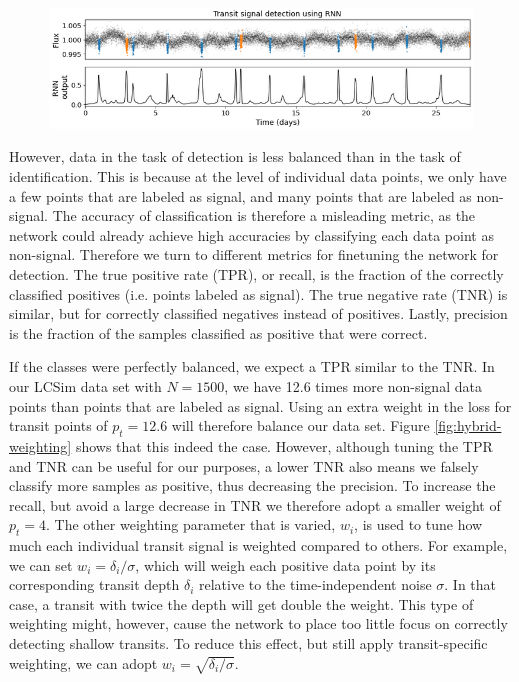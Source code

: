 \begin{figure}
    \centering
    \includegraphics[width=0.8\linewidth]{Experiments/Figures/Hybrid/PTS_example.png}
    \caption{}
    \label{fig:hybrid-pts}
\end{figure}

However, data in the task of detection is less balanced than in the task of identification. This is because at the level of individual data points, we only have a few points that are labeled as signal, and many points that are labeled as non-signal. The accuracy of classification is therefore a misleading metric, as the network could already achieve high accuracies by classifying each data point as non-signal. Therefore we turn to different metrics for finetuning the network for detection. The true positive rate (TPR), or recall, is the fraction of the correctly classified positives (i.e. points labeled as signal). The true negative rate (TNR) is similar, but for correctly classified negatives instead of positives. Lastly, precision is the fraction of the samples classified as positive that were correct. 

If the classes were perfectly balanced, we expect a TPR similar to the TNR. In our LCSim data set with $N=1500$, we have 12.6 times more non-signal data points than points that are labeled as signal. Using an extra weight in the loss for transit points of $p_t=12.6$ will therefore balance our data set. Figure \ref{fig:hybrid-weighting} shows that this indeed the case. However, although tuning the TPR and TNR can be useful for our purposes, a lower TNR also means we falsely classify more samples as positive, thus decreasing the precision. To increase the recall, but avoid a large decrease in TNR we therefore adopt a smaller weight of $p_t=4$. The other weighting parameter that is varied, $w_i$, is used to tune how much each individual transit signal is weighted compared to others. For example, we can set $w_i = \delta_i / \sigma$, which will weigh each positive data point by its corresponding transit depth $\delta_i$ relative to the time-independent noise $\sigma$. In that case, a transit with twice the depth will get double the weight. This type of weighting might, however, cause the network to place too little focus on correctly detecting shallow transits. To reduce this effect, but still apply transit-specific weighting, we can adopt $w_i = \sqrt{\delta_i / \sigma}$. 



